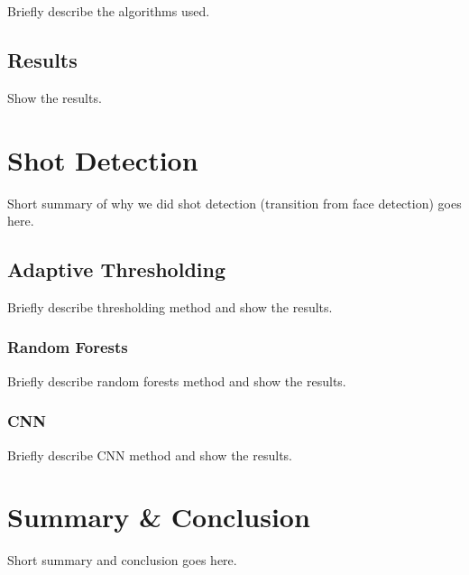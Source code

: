 \documentclass[a4paper, 11pt]{article} %
\begin{document}
Briefly describe the algorithms used.

\subsection*{Results}

Show the results.


\section*{Shot Detection}

Short summary of why we did shot detection (transition from face detection) goes here.

\subsection*{Adaptive Thresholding}

Briefly describe thresholding method and show the results.

\subsubsection*{Random Forests}

Briefly describe random forests method and show the results.

\subsubsection*{CNN}

Briefly describe CNN method and show the results.


\section*{Summary \& Conclusion}

Short summary and conclusion goes here.






\end{document}
